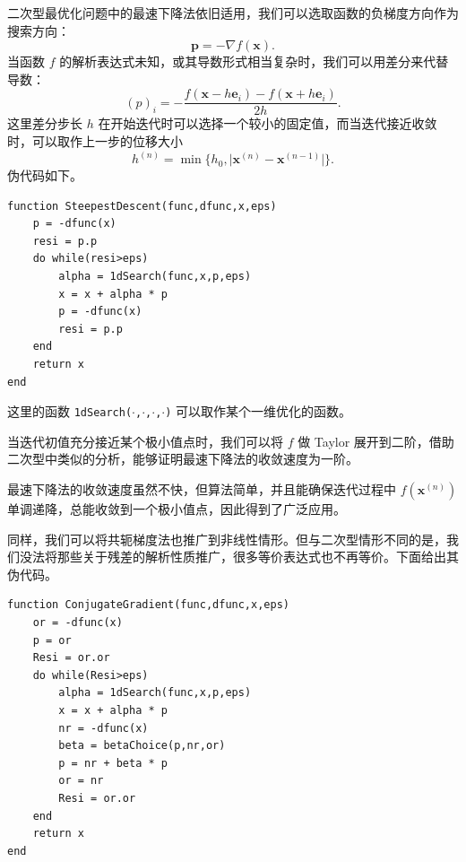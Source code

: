 二次型最优化问题中的最速下降法依旧适用，我们可以选取函数的负梯度方向作为搜索方向：
\begin{equation}
\bm p=-\nabla f(\bm x).
\tag{4.1.6}
\end{equation}
当函数 $f$ 的解析表达式未知，或其导数形式相当复杂时，我们可以用差分来代替导数：
\begin{equation}
(p)_i=-\frac{f(\bm x-h\bm e_i)-f(\bm x+h\bm e_i)}{2h}.
\tag{4.1.7}
\end{equation}
这里差分步长 $h$ 在开始迭代时可以选择一个较小的固定值，而当迭代接近收敛时，可以取作上一步的位移大小
\begin{equation}
h^{(n)}=\min\{h_0,\lvert\bm x^{(n)}-\bm x^{(n-1)}\rvert\}.
\tag{4.1.8}
\end{equation}
伪代码如下。

\begin{algorithmBox}
\begin{lstlisting}[style=bellacode]
function SteepestDescent(func,dfunc,x,eps)
    p = -dfunc(x)
    resi = p.p
    do while(resi>eps)
        alpha = 1dSearch(func,x,p,eps)
        x = x + alpha * p
        p = -dfunc(x)
        resi = p.p
    end
    return x
end
\end{lstlisting}
\end{algorithmBox}

这里的函数 \texttt{1dSearch($\cdot$,$\cdot$,$\cdot$,$\cdot$)} 可以取作某个一维优化的函数。

当迭代初值充分接近某个极小值点时，我们可以将 $f$ 做 Taylor 展开到二阶，借助二次型中类似的分析，能够证明最速下降法的收敛速度为一阶。

最速下降法的收敛速度虽然不快，但算法简单，并且能确保迭代过程中 $f(\bm x^{(n)})$ 单调递降，总能收敛到一个极小值点，因此得到了广泛应用。

同样，我们可以将共轭梯度法也推广到非线性情形。但与二次型情形不同的是，我们没法将那些关于残差的解析性质推广，很多等价表达式也不再等价。下面给出其伪代码。

\begin{algorithmBox}
\begin{lstlisting}[style=bellacode]
function ConjugateGradient(func,dfunc,x,eps)
    or = -dfunc(x)
    p = or
    Resi = or.or
    do while(Resi>eps)
        alpha = 1dSearch(func,x,p,eps)
        x = x + alpha * p
        nr = -dfunc(x)
        beta = betaChoice(p,nr,or)
        p = nr + beta * p
        or = nr
        Resi = or.or
    end
    return x
end
\end{lstlisting}
\end{algorithmBox}


